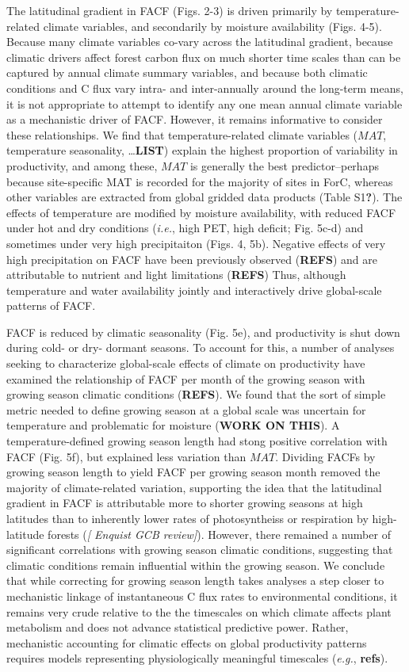 \documentclass[]{article}
\begin{document}
The latitudinal gradient in FACF (Figs. 2-3) is driven primarily by
temperature-related climate variables, and secondarily by moisture
availability (Figs. 4-5). Because many climate variables co-vary across
the latitudinal gradient, because climatic drivers affect forest carbon
flux on much shorter time scales than can be captured by annual climate
summary variables, and because both climatic conditions and C flux vary
intra- and inter-annually around the long-term means, it is not
appropriate to attempt to identify any one mean annual climate variable
as a mechanistic driver of FACF. However, it remains informative to
consider these relationships. We find that temperature-related climate
variables (\(MAT\), temperature seasonality, \ldots{}\textbf{LIST})
explain the highest proportion of variability in productivity, and among
these, \(MAT\) is generally the best predictor--perhaps because
site-specific MAT is recorded for the majority of sites in ForC, whereas
other variables are extracted from global gridded data products (Table
S1\textbf{?}). The effects of temperature are modified by moisture
availability, with reduced FACF under hot and dry conditions
(\emph{i.e.}, high PET, high deficit; Fig. 5c-d) and sometimes under
very high precipitaiton (Figs. 4, 5b). Negative effects of very high
precipitation on FACF have been previously observed (\textbf{REFS}) and
are attributable to nutrient and light limitations (\textbf{REFS}) Thus,
although temperature and water availability jointly and interactively
drive global-scale patterns of FACF.

FACF is reduced by climatic seasonality (Fig. 5e), and productivity is
shut down during cold- or dry- dormant seasons. To account for this, a
number of analyses seeking to characterize global-scale effects of
climate on productivity have examined the relationship of FACF per month
of the growing season with growing season climatic conditions
(\textbf{REFS}). We found that the sort of simple metric needed to
define growing season at a global scale was uncertain for temperature
and problematic for moisture (\textbf{WORK ON THIS}). A
temperature-defined growing season length had stong positive correlation
with FACF (Fig. 5f), but explained less variation than \(MAT\). Dividing
FACFs by growing season length to yield FACF per growing season month
removed the majority of climate-related variation, supporting the idea
that the latitudinal gradient in FACF is attributable more to shorter
growing seasons at high latitudes than to inherently lower rates of
photosyntheiss or respiration by high-latitude forests (\emph{{[}
Enquist GCB review{]}}). However, there remained a number of significant
correlations with growing season climatic conditions, suggesting that
climatic conditions remain influential within the growing season. We
conclude that while correcting for growing season length takes analyses
a step closer to mechanistic linkage of instantaneous C flux rates to
environmental conditions, it remains very crude relative to the the
timescales on which climate affects plant metabolism and does not
advance statistical predictive power. Rather, mechanistic accounting for
climatic effects on global productivity patterns requires models
representing physiologically meaningful timescales (\emph{e.g.},
\textbf{refs}).
\end{document}
